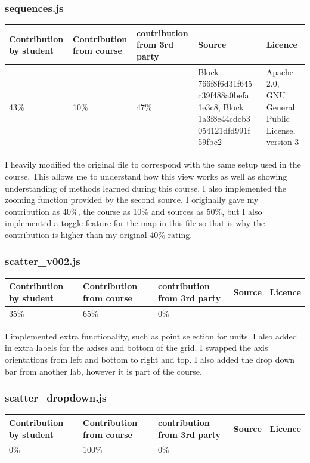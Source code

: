 \documentclass[a4paper, 11pt]{article}
\begin{document}
\subsubsection{sequences.js}
\begin{center}
 \begin{tabular}{||p{}|p{}|p{}|p{}|p{}||} 
 \hline
 Contribution by student & Contribution from course & contribution from 3rd party & Source & Licence 
 \\
 \hline
 43\% & 10\% & 47\% & Block 766f8f6d31f645 c39f488a0befa 1e3c8, Block 1a3f8e44cdcb3 054121dfd991f 59fbc2 & Apache 2.0, GNU General Public License, version 3
 \\
 \hline
\end{tabular}
\end{center}
I heavily modified the original file to correspond with the same setup used in the course. This allows me to understand how this view works as well as showing understanding of methods learned during this course. I also implemented the zooming function provided by the second source. I originally gave my contribution as 40\%, the course as 10\% and sources as 50\%, but I also implemented a toggle feature for the map in this file so that is why the contribution is higher than my original 40\% rating.


\subsubsection{scatter\_v002.js}
\begin{center}
 \begin{tabular}{||p{}|p{}|p{}|p{}|p{}||} 
 \hline
 Contribution by student & Contribution from course & contribution from 3rd party & Source & Licence 
 \\
 \hline
 35\% & 65\% & 0\% & & 
 \\
 \hline
\end{tabular}
\end{center}
I implemented extra functionality, such as point selection for units. I also added in extra labels for the axises and bottom of the grid. I swapped the axis orientations from left and bottom to right and top. I also added the drop down bar from another lab, however it is part of the course.

\subsubsection{scatter\_dropdown.js}
\begin{center}
 \begin{tabular}{||p{}|p{}|p{}|p{}|p{}||} 
 \hline
 Contribution by student & Contribution from course & contribution from 3rd party & Source & Licence 
 \\
 \hline
 0\% & 100\% & 0\% & & 
 \\
 \hline
\end{tabular}
\end{center}
\end{document}

